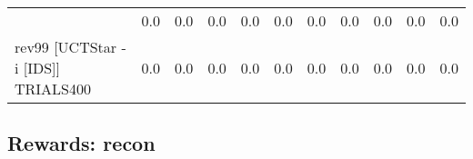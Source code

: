 \documentclass{article}
\begin{document}
\begin{tabular}{|l|r@{$\pm$}rr@{$\pm$}rr@{$\pm$}rr@{$\pm$}rr@{$\pm$}rr@{$\pm$}rr@{$\pm$}rr@{$\pm$}rr@{$\pm$}rr@{$\pm$}r|}
& \multicolumn{2}{c}{0.0}
& \multicolumn{2}{c}{0.0}
& \multicolumn{2}{c}{0.0}
& \multicolumn{2}{c}{0.0}
& \multicolumn{2}{c}{0.0}
& \multicolumn{2}{c}{0.0}
& \multicolumn{2}{c}{0.0}
& \multicolumn{2}{c}{0.0}
& \multicolumn{2}{c}{0.0}
& \multicolumn{2}{c|}{0.0}
\\
rev99 [UCTStar -i [IDS]] TRIALS400
& \multicolumn{2}{c}{0.0}
& \multicolumn{2}{c}{0.0}
& \multicolumn{2}{c}{0.0}
& \multicolumn{2}{c}{0.0}
& \multicolumn{2}{c}{0.0}
& \multicolumn{2}{c}{0.0}
& \multicolumn{2}{c}{0.0}
& \multicolumn{2}{c}{0.0}
& \multicolumn{2}{c}{0.0}
& \multicolumn{2}{c|}{0.0}
\\
\hline
\end{tabular}%

\bigskip

\subsection*{Rewards: recon}
\end{document}
